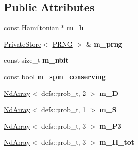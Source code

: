 \subsection*{Public Attributes}
\begin{DoxyCompactItemize}
\item 
const \hyperlink{classHamiltonian}{Hamiltonian} $\ast$ {\bfseries m\+\_\+h}\hypertarget{classHeatBathSampler_a9feb97a6236c0396863bf3033785c6fa}{}\label{classHeatBathSampler_a9feb97a6236c0396863bf3033785c6fa}

\item 
\hyperlink{classPrivateStore}{Private\+Store}$<$ \hyperlink{classPRNG}{P\+R\+NG} $>$ \& {\bfseries m\+\_\+prng}\hypertarget{classHeatBathSampler_aac2d2e3f13e8193d507ebcd491b4f44a}{}\label{classHeatBathSampler_aac2d2e3f13e8193d507ebcd491b4f44a}

\item 
const size\+\_\+t {\bfseries m\+\_\+nbit}\hypertarget{classHeatBathSampler_a7b3f6c7339b6b02cbce19f71ac798e6e}{}\label{classHeatBathSampler_a7b3f6c7339b6b02cbce19f71ac798e6e}

\item 
const bool {\bfseries m\+\_\+spin\+\_\+conserving}\hypertarget{classHeatBathSampler_a06e2bace728f8f540f2698053d363e75}{}\label{classHeatBathSampler_a06e2bace728f8f540f2698053d363e75}

\item 
\hyperlink{classNdArray}{Nd\+Array}$<$ defs\+::prob\+\_\+t, 2 $>$ {\bfseries m\+\_\+D}\hypertarget{classHeatBathSampler_a537dec2d0390d75eede2132fff9f67da}{}\label{classHeatBathSampler_a537dec2d0390d75eede2132fff9f67da}

\item 
\hyperlink{classNdArray}{Nd\+Array}$<$ defs\+::prob\+\_\+t, 1 $>$ {\bfseries m\+\_\+S}\hypertarget{classHeatBathSampler_aba54811d98e2da7b7199ae262015167b}{}\label{classHeatBathSampler_aba54811d98e2da7b7199ae262015167b}

\item 
\hyperlink{classNdArray}{Nd\+Array}$<$ defs\+::prob\+\_\+t, 3 $>$ {\bfseries m\+\_\+\+P3}\hypertarget{classHeatBathSampler_a5e69f450cf6034420ff174ae2b656ba9}{}\label{classHeatBathSampler_a5e69f450cf6034420ff174ae2b656ba9}

\item 
\hyperlink{classNdArray}{Nd\+Array}$<$ defs\+::prob\+\_\+t, 3 $>$ {\bfseries m\+\_\+\+H\+\_\+tot}\hypertarget{classHeatBathSampler_a197eb4103e8bde4143fe5ce8529c8b9c}{}\label{classHeatBathSampler_a197eb4103e8bde4143fe5ce8529c8b9c}


\end{DoxyCompactItemize}
